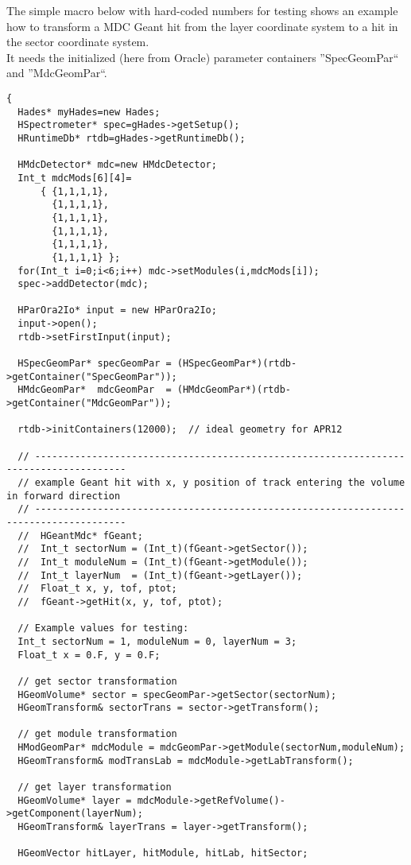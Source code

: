 The simple macro below with hard-coded numbers for testing shows an example how to transform a MDC Geant hit from the layer 
coordinate system to a hit in the sector coordinate system.\\
It needs the initialized (here from Oracle) parameter containers ''SpecGeomPar`` and ''MdcGeomPar``.
\begin{lstlisting}
{
  Hades* myHades=new Hades;
  HSpectrometer* spec=gHades->getSetup();
  HRuntimeDb* rtdb=gHades->getRuntimeDb();

  HMdcDetector* mdc=new HMdcDetector;
  Int_t mdcMods[6][4]=
      { {1,1,1,1},
        {1,1,1,1},
        {1,1,1,1},
        {1,1,1,1},
        {1,1,1,1},
        {1,1,1,1} };
  for(Int_t i=0;i<6;i++) mdc->setModules(i,mdcMods[i]);
  spec->addDetector(mdc);

  HParOra2Io* input = new HParOra2Io;
  input->open();
  rtdb->setFirstInput(input);

  HSpecGeomPar* specGeomPar = (HSpecGeomPar*)(rtdb->getContainer("SpecGeomPar"));
  HMdcGeomPar*  mdcGeomPar  = (HMdcGeomPar*)(rtdb->getContainer("MdcGeomPar"));

  rtdb->initContainers(12000);  // ideal geometry for APR12

  // --------------------------------------------------------------------------------------
  // example Geant hit with x, y position of track entering the volume in forward direction
  // --------------------------------------------------------------------------------------
  //  HGeantMdc* fGeant;
  //  Int_t sectorNum = (Int_t)(fGeant->getSector());
  //  Int_t moduleNum = (Int_t)(fGeant->getModule());
  //  Int_t layerNum  = (Int_t)(fGeant->getLayer());
  //  Float_t x, y, tof, ptot;
  //  fGeant->getHit(x, y, tof, ptot);

  // Example values for testing:
  Int_t sectorNum = 1, moduleNum = 0, layerNum = 3;
  Float_t x = 0.F, y = 0.F;

  // get sector transformation
  HGeomVolume* sector = specGeomPar->getSector(sectorNum);
  HGeomTransform& sectorTrans = sector->getTransform();

  // get module transformation
  HModGeomPar* mdcModule = mdcGeomPar->getModule(sectorNum,moduleNum);
  HGeomTransform& modTransLab = mdcModule->getLabTransform();

  // get layer transformation
  HGeomVolume* layer = mdcModule->getRefVolume()->getComponent(layerNum);
  HGeomTransform& layerTrans = layer->getTransform();

  HGeomVector hitLayer, hitModule, hitLab, hitSector;


\end{lstlisting}
